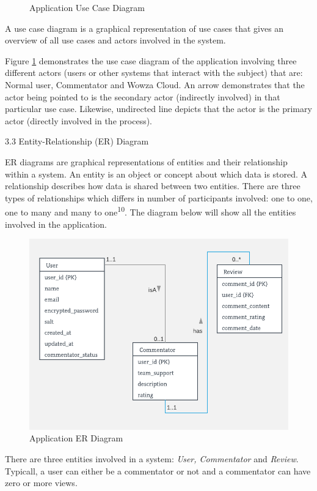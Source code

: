 \documentclass{article}
\begin{document}
\begin{flushleft}
\begin{figure}[H]
    \caption{Application Use Case Diagram}
    \label{fig:use-case-diagram}
\end{figure}
A use case diagram is a graphical representation of use cases that gives an overview of all use cases and actors involved in the system.\par
Figure \ref{fig:use-case-diagram} demonstrates the use case diagram of the application involving three different actors (users or other systems that interact with the subject) that are: Normal user, Commentator and Wowza Cloud. An arrow demonstrates that the actor being pointed to is the secondary actor (indirectly involved) in that particular use case. Likewise, undirected line depicts that the actor is the primary actor (directly involved in the process).\par
{\Large 3.3 Entity-Relationship (ER) Diagram}\par
ER diagrams are graphical representations of entities and their relationship within a system. An entity is an object or concept about which data is stored. A relationship describes how data is shared between two entities.  There are three types of relationships which differs in number of participants involved: one to one, one to many and many to one\textsuperscript{10}. The diagram below will show all the entities involved in the application.\par
\begin{figure}[H]
	\centering
	\includegraphics[width=14cm]{er-diagram}
	\caption{Application ER Diagram}
	\label{fig:er-diagram}
\end{figure}
There are three entities involved in a system: \textit{User, Commentator} and \textit{Review}. Typicall, a user can either be a commentator or not and a commentator can have zero or more views.\par

\end{flushleft}
\end{document}
